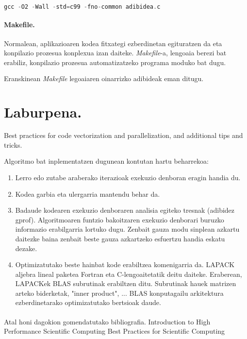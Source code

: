 \begin{lstlisting}[language=C]
gcc -O2 -Wall -std=c99 -fno-common adibidea.c
\end{lstlisting}

\paragraph*{Makefile.}

Normalean, aplikazioaren kodea fitxategi ezberdinetan egituratzen da eta konpilazio prozesua konplexua izan daiteke. \emph{Makefile}-a, lengoaia berezi bat erabiliz, konpilazio prozesua automatizatzeko programa moduko bat dugu.

Eranskinean \emph{Makefile} legoaiaren oinarrizko adibideak eman ditugu.

\section{Laburpena.}

Best practices for code vectorization and parallelization, and additional tips and tricks.

Algoritmo bat inplementatzen dugunean kontutan hartu beharrekoa:

\begin{enumerate}

\item Lerro edo zutabe araberako iterazioak exekuzio denboran eragin handia du.

\item Kodea garbia eta ulergarria mantendu behar da.

\item Badaude kodearen exekuzio denboraren analisia egiteko tresnak (adibidez gprof). Algoritmoaren funtzio bakoitzaren exekuzio denborari buruzko informazio erabilgarria lortuko dugu. Zenbait gauza modu sinplean azkartu daitezke baina zenbait beste gauza azkartzeko esfuertzu handia eskatu dezake.

\item Optimizatutako beste hainbat kode erabiltzea komenigarria da. LAPACK aljebra lineal paketea Fortran eta C-lengoaitetatik deitu daiteke. Eraberean, LAPACKek BLAS subrutinak erabiltzen ditu.  Subrutinak hauek matrizen arteko biderketak, "inner product", ... BLAS konputagailu arkitektura ezberdinetarako optimizatutako bertsioak daude.
 
\end{enumerate}

\paragraph*{} Atal honi dagokion gomendatutako bibliografia. 
Introduction to High Performance Scientific Computing \cite{Eijkhout2011}
Best Practices for Scientific Computing  \cite{Wilson2014}
